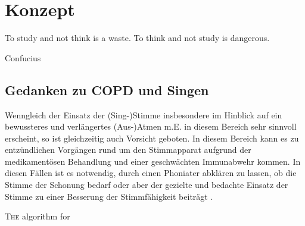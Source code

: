 
\chapter{Konzept}
\label{chapter:konzept}
\setlength{\epigraphwidth}{7.0cm}
\epigraph{To study and not think is a waste. To think and not study is dangerous.}{Confucius}

\section{Gedanken zu COPD und Singen}
Wenngleich der Einsatz der (Sing-)Stimme insbesondere im Hinblick auf ein bewussteres und verlängertes (Aus-)Atmen m.E. in diesem Bereich sehr sinnvoll erscheint, so ist gleichzeitig auch Vorsicht geboten. In diesem Bereich kann es zu entzündlichen Vorgängen rund um den Stimmapparat aufgrund der medikamentösen Behandlung und einer geschwächten Immunabwehr kommen. In diesen Fällen ist es notwendig, durch einen Phoniater abklären zu lassen, ob die Stimme der Schonung bedarf oder aber der gezielte und bedachte Einsatz der Stimme zu einer Besserung der Stimmfähigkeit beiträgt \autocite[vgl.][103ff.]{alavi2009}.
\ifpdf
    \graphicspath{{5_konzept/figures/PNG/}{5_konzept/figures/PDF/}{5_konzept/figures/}}
\else
    \graphicspath{{5_konzept/figures/EPS/}{5_konzept/figures/}}
\fi

\lettrine{T}{he} algorithm for

\newpage\thispagestyle{empty}
